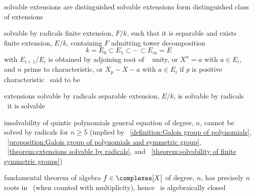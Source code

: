 \documentclass[17pt,landscape]{foils}
\begin{document}
{\begin{mytheorem}{solvable extensions are distinguished}
	solvable extensions form distinguished class of extensions
\end{mytheorem}

\begin{mydefinition}{solvable by radicals}
	finite extension, $F/k$,
	such that it is separable
	and exists finite extension, $E/k$, containing $F$
	admitting tower decomposition
	$$
		k = E_0 \subset E_1 \subset \cdots \subset E_m = E
	$$
	with $E_{i+1}/E_i$ is obtained by adjoining root of
	\shrinkspacewithintheoremslike\
	\ibit
	\iitem
		unity, or
	\iitem
		$X^n=a$ with $a\in E_i$, and $n$ prime to characteristic, or
	\iitem
		$X_p-X-a$ with $a\in E_i$ if $p$ is positive characteristic
	\eit
	\shrinkspacewithintheoremslike\
	said to be 
\end{mydefinition}

\begin{mytheorem}{extensions solvable by radicals}
	separable extension, $E/k$,
	is solvable by radicals
	\iaoi\
	it is solvable
\end{mytheorem}



\begin{mytheorem}{insolvability of quintic polynomials}
	general equation of degree, $n$,
	cannot be solved by radicals
	for $n\geq5$
	(implied by
	~\ref{definition:Galois group of polynomials},
	\propositionname~\ref{proposition:Galois group of polynomials and symmetric group},
	\theoremname~\ref{theorem:extensions solvable by radicals},
	and
	\theoremname~\ref{theorem:solvability of finite symmetric groups})
\end{mytheorem}

\vfill
\begin{mytheorem}{fundamental theorem of algebra}%
	$f\in \complexes[X]$ of degree, $n$,
	has precisely $n$ roots in \complexes\
	(when counted with multiplicity),
	hence
	\complexes\ is algebraically closed
\end{mytheorem}
\vfill

}{}
\end{document}
